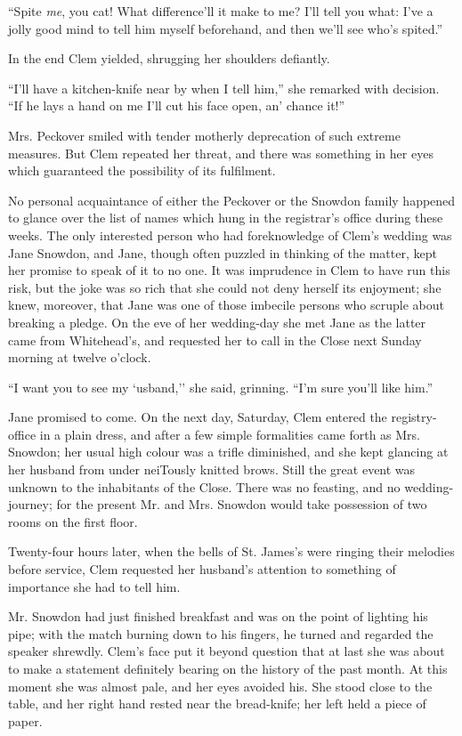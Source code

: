 ``Spite \emph{me}, you cat! What difference'll it make to me? I'll tell
you what: I've a jolly good mind to tell him myself beforehand, and then
we'll see who's spited.''

In the end Clem yielded, shrugging her shoulders defiantly.

``I'll have a kitchen-knife near by when I tell him,'' she remarked with
decision. ``If he lays a hand on me I'll cut his face open, an' chance
it!''

Mrs. Peckover smiled with tender motherly deprecation of such extreme
measures. But Clem repeated her threat, and there was something in her
eyes which guaranteed the possibility of its fulfilment.

No personal acquaintance of either the
{\protect\hypertarget{65}{}{}}Peckover or the Snowdon family happened to
glance over the list of names which hung in the registrar's office
during these weeks. The only interested person who had foreknowledge of
Clem's wedding was Jane Snowdon, and Jane, though often puzzled in
thinking of the matter, kept her promise to speak of it to no one. It
was imprudence in Clem to have run this risk, but the joke was so rich
that she could not deny herself its enjoyment; she knew, moreover, that
Jane was one of those imbecile persons who scruple about breaking a
pledge. On the eve of her wedding-day she met Jane as the latter came
from Whitehead's, and requested her to call in the Close next Sunday
morning at twelve o'clock.

``I want you to see my `usband,'' she said, grinning. ``I'm sure you'll
like him.''

Jane promised to come. On the next day, Saturday, Clem entered the
registry-office in a plain dress, and after a few simple formalities
came forth as Mrs. Snowdon; her usual high colour was a trifle
diminished, and she {\protect\hypertarget{66}{}{}}kept glancing at her
husband from under neiTously knitted brows. Still the great event was
unknown to the inhabitants of the Close. There was no feasting, and no
wedding-journey; for the present Mr. and Mrs. Snowdon would take
possession of two rooms on the first floor.

Twenty-four hours later, when the bells of St. James's were ringing
their melodies before service, Clem requested her husband's attention to
something of importance she had to tell him.

Mr. Snowdon had just finished breakfast and was on the point of lighting
his pipe; with the match burning down to his fingers, he turned and
regarded the speaker shrewdly. Clem's face put it beyond question that
at last she was about to make a statement definitely bearing on the
history of the past month. At this moment she was almost pale, and her
eyes avoided his. She stood close to the table, and her right hand
rested near the bread-knife; her left held a piece of paper.

